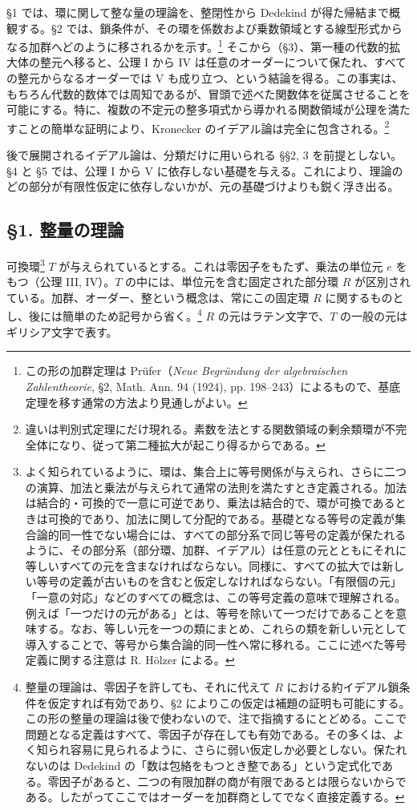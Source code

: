 \documentclass[11pt]{article}
\begin{document}
§1 では、環に関して整な量の理論を、整閉性から Dedekind が得た帰結まで概観する。§2 では、鎖条件が、その環を係数および乗数領域とする線型形式からなる加群へどのように移されるかを示す。\footnote{この形の加群定理は Prüfer（\emph{Neue Begründung der algebraischen Zahlentheorie}, §2, Math. Ann. 94 (1924), pp. 198--243）によるもので、基底定理を移す通常の方法より見通しがよい。} そこから（§3）、第一種の代数的拡大体の整元へ移ると、公理 I から IV は任意のオーダーについて保たれ、すべての整元からなるオーダーでは V も成り立つ、という結論を得る。この事実は、もちろん代数的数体では周知であるが、冒頭で述べた関数体を従属させることを可能にする。特に、複数の不定元の整多項式から導かれる関数領域が公理を満たすことの簡単な証明により、Kronecker のイデアル論は完全に包含される。\footnote{違いは判別式定理にだけ現れる。素数を法とする関数領域の剰余類環が不完全体になり、従って第二種拡大が起こり得るからである。}

後で展開されるイデアル論は、分類だけに用いられる §§2, 3 を前提としない。§4 と §5 では、公理 I から V に依存しない基礎を与える。これにより、理論のどの部分が有限性仮定に依存しないかが、元の基礎づけよりも鋭く浮き出る。

\subsection*{§1. 整量の理論}

可換環\footnote{よく知られているように、環は、集合上に等号関係が与えられ、さらに二つの演算、加法と乗法が与えられて通常の法則を満たすとき定義される。加法は結合的・可換的で一意に可逆であり、乗法は結合的で、環が可換であるときは可換的であり、加法に関して分配的である。基礎となる等号の定義が集合論的同一性でない場合には、すべての部分系で同じ等号の定義が保たれるように、その部分系（部分環、加群、イデアル）は任意の元とともにそれに等しいすべての元を含まなければならない。同様に、すべての拡大では新しい等号の定義が古いものを含むと仮定しなければならない。「有限個の元」「一意の対応」などのすべての概念は、この等号定義の意味で理解される。例えば「一つだけの元がある」とは、等号を除いて一つだけであることを意味する。なお、等しい元を一つの類にまとめ、これらの類を新しい元として導入することで、等号から集合論的同一性へ常に移れる。ここに述べた等号定義に関する注意は R. Hölzer による。} $T$ が与えられているとする。これは零因子をもたず、乗法の単位元 $e$ をもつ（公理 III, IV）。$T$ の中には、単位元を含む固定された部分環 $R$ が区別されている。加群、オーダー、整という概念は、常にこの固定環 $R$ に関するものとし、後には簡単のため記号から省く。\footnote{整量の理論は、零因子を許しても、それに代えて $R$ における約イデアル鎖条件を仮定すれば有効であり、§2 によりこの仮定は補題の証明も可能にする。この形の整量の理論は後で使わないので、注で指摘するにとどめる。ここで問題となる定義はすべて、零因子が存在しても有効である。その多くは、よく知られ容易に見られるように、さらに弱い仮定しか必要としない。保たれないのは Dedekind の「数は包絡をもつとき整である」という定式化である。零因子があると、二つの有限加群の商が有限であるとは限らないからである。したがってここではオーダーを加群商としてでなく直接定義する。} $R$ の元はラテン文字で、$T$ の一般の元はギリシア文字で表す。
\end{document}
